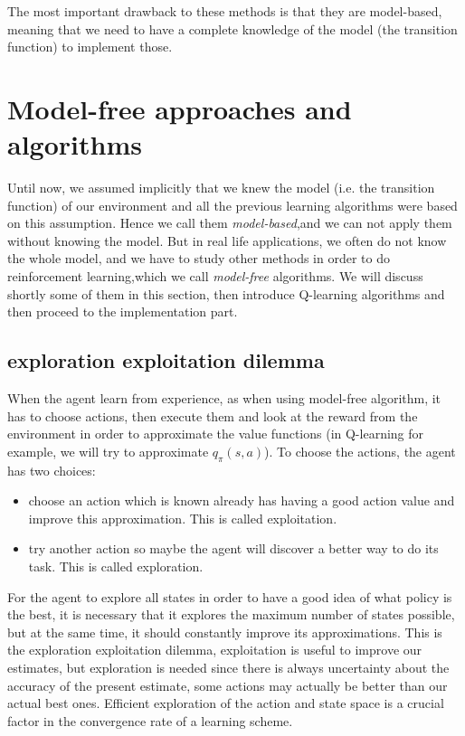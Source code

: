 \documentclass[14pt,a4paper]{article}
\theoremstyle{definition}
\begin{document}
The most important drawback to these methods is that they are model-based, meaning that we need to have a complete knowledge of the model (the transition function) to implement those.

\section{Model-free approaches and algorithms}

Until now, we assumed implicitly that we knew the model (i.e. the transition function) of our environment and all the previous learning algorithms were based on this assumption. Hence we call them \emph{model-based},and we can not apply them without knowing the model. But in real life applications, we often do not know the whole model, and we have to study other methods in order to do reinforcement learning,which we call \emph{model-free} algorithms. We will discuss shortly some of them in this section, then introduce Q-learning algorithms and then proceed to the implementation part.


\subsection{exploration exploitation dilemma}

When the agent learn from experience, as when using model-free algorithm, it has to choose actions, then execute them and look at the reward from the environment in order to approximate the value functions (in Q-learning for example, we will try to approximate $q_\pi(s,a)$). To choose the actions, the agent has two choices:
\begin{itemize}
\item choose an action which is known already has having a good action value and improve this approximation. This is called exploitation.
\item try another action so maybe the agent will discover a better way to do its task. This is called exploration. 
\end{itemize}

For the agent to explore all states in order to have a good idea of what policy is the best, it is necessary that it explores the maximum number of states possible, but at the same time, it should constantly improve its approximations. This is the exploration exploitation dilemma, exploitation is useful to improve our estimates, but exploration is needed since there is always uncertainty about the accuracy of the present estimate, some actions may actually be better than our actual best ones. Efficient exploration of the action and state space is a crucial factor in the convergence rate of a learning scheme.
\end{document}
